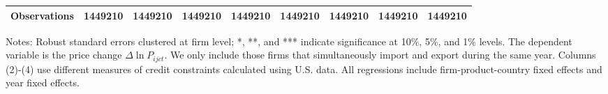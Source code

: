 \begin{table}
\begin{threeparttable}
\begin{tabular}{lcccccccc}
			Observations & 1449210 & 1449210 & 1449210 & 1449210 & 1449210 & 1449210 & 1449210 & 1449210\\
			\bottomrule
		\end{tabular}
		\begin{tablenotes}
			\footnotesize
			\item Notes: Robust standard errors clustered at firm level; *, **, and *** indicate significance at 10\%, 5\%, and 1\% levels. The dependent variable is the price change $\Delta \ln P_{ijct}$. We only include those firms that simultaneously import and export during the same year. Columns (2)-(4) use different measures of credit constraints calculated using U.S. data. All regressions include firm-product-country fixed effects and year fixed effects.
		\end{tablenotes}
	\end{threeparttable}
	\label{tab.robust.tradetype}
\end{table}

